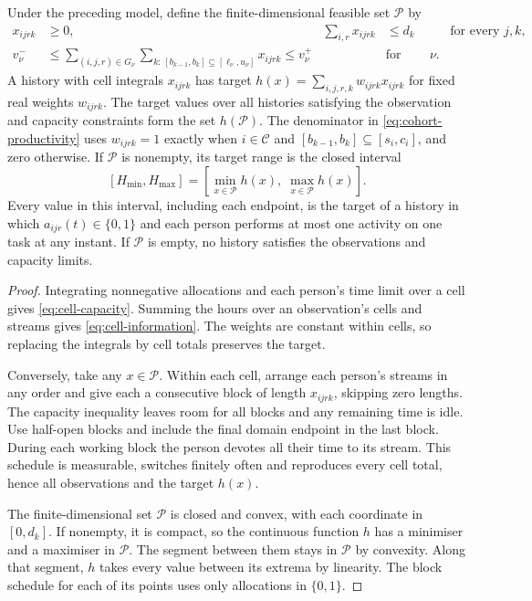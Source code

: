 \begin{proposition}
\label{prop:cell-reduction}
Under the preceding model, define the finite-dimensional feasible set $\mathcal P$ by
\begin{align}
\label{eq:cell-capacity}
 x_{ijrk}&\geq0,&\sum_{i,r}x_{ijrk}&\leq d_k
 &&\text{for every }j,k,\\
\label{eq:cell-information}
 v_\nu^-&\leq
 \sum_{(i,j,r)\in G_\nu}
 \sum_{k:\,[b_{k-1},b_k]\subseteq[\ell_\nu,u_\nu]}x_{ijrk}
 \leq v_\nu^+ &&\text{for every }\nu.
\end{align}
A history with cell integrals $x_{ijrk}$ has target $h(x)=\sum_{i,j,r,k}w_{ijrk}x_{ijrk}$ for fixed real weights $w_{ijrk}$. The target values over all histories satisfying the observation and capacity constraints form the set $h(\mathcal P)$. The denominator in \eqref{eq:cohort-productivity} uses $w_{ijrk}=1$ exactly when $i\in\mathcal C$ and $[b_{k-1},b_k]\subseteq[s_i,c_i]$, and zero otherwise. If $\mathcal P$ is nonempty, its target range is the closed interval
\begin{equation}
\label{eq:sharp-labour-range}
 [H_{\min},H_{\max}]
 =\left[\min_{x\in\mathcal P}h(x),\;\max_{x\in\mathcal P}h(x)\right].
\end{equation}
Every value in this interval, including each endpoint, is the target of a history in which $a_{ijr}(t)\in\{0,1\}$ and each person performs at most one activity on one task at any instant. If $\mathcal P$ is empty, no history satisfies the observations and capacity limits.
\end{proposition}
\begin{proof}
Integrating nonnegative allocations and each person's time limit over a cell gives \eqref{eq:cell-capacity}. Summing the hours over an observation's cells and streams gives \eqref{eq:cell-information}. The weights are constant within cells, so replacing the integrals by cell totals preserves the target.

Conversely, take any $x\in\mathcal P$. Within each cell, arrange each person's streams in any order and give each a consecutive block of length $x_{ijrk}$, skipping zero lengths. The capacity inequality leaves room for all blocks and any remaining time is idle. Use half-open blocks and include the final domain endpoint in the last block. During each working block the person devotes all their time to its stream. This schedule is measurable, switches finitely often and reproduces every cell total, hence all observations and the target $h(x)$.

The finite-dimensional set $\mathcal P$ is closed and convex, with each coordinate in $[0,d_k]$. If nonempty, it is compact, so the continuous function $h$ has a minimiser and a maximiser in $\mathcal P$. The segment between them stays in $\mathcal P$ by convexity. Along that segment, $h$ takes every value between its extrema by linearity. The block schedule for each of its points uses only allocations in $\{0,1\}$.
\end{proof}

